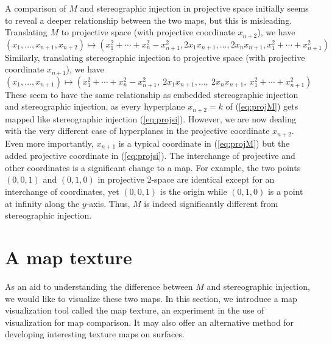 A comparison of $M$ and stereographic injection in projective space initially 
seems to reveal a deeper relationship between the two maps,
but this is misleading.
Translating $M$ to projective space (with projective coordinate $x_{n+2}$), 
we have
\begin{equation}
\label{eq:projM}
(x_1,\ldots,x_{n+1},x_{n+2}) \mapsto 
	(x_1^2 + \cdots + x_{n}^2 - x_{n+1}^2,
	 2x_1x_{n+1}, \ldots, 2x_nx_{n+1}, x_1^2 + \cdots + x_{n+1}^2)
\end{equation}
Similarly, translating stereographic injection to projective space 
(with projective coordinate $x_{n+1}$), we have
\begin{equation}
\label{eq:projsi}
	(x_1,\ldots,x_{n+1}) \mapsto
	(x_1^2 + \cdots + x_n^2 - x_{n+1}^2,\ 2x_{1}x_{n+1}, \ldots,\ 2x_{n}x_{n+1},\ 
	x_1^2 + \cdots + x_{n+1}^2)
\end{equation}
These seem to have the same relationship as embedded stereographic
injection and stereographic injection,
as every hyperplane $x_{n+2}=k$ of (\ref{eq:projM}) gets mapped 
like stereographic injection (\ref{eq:projsi}).
However, we are now dealing with the very different case of 
hyperplanes in the projective coordinate $x_{n+2}$.
Even more importantly, $x_{n+1}$ is a typical %
coordinate in (\ref{eq:projM}) but the added projective coordinate in (\ref{eq:projsi}).
The interchange of projective and other coordinates is a significant
change to a map. %
For example, the two points $(0,0,1)$ and $(0,1,0)$ in projective 2-space
are identical except for an interchange of coordinates,
yet $(0,0,1)$ is the origin while $(0,1,0)$ is a point at infinity
along the $y$-axis.
Thus, $M$ is indeed significantly different from stereographic injection.

\section{A map texture}
\label{sec:maptexture}

As an aid to understanding the difference between $M$ and stereographic 
injection, we would like to visualize these two maps.
In this section, we introduce a map visualization tool called the map texture,
an experiment in the use of visualization for map comparison.
It may also offer an alternative method for developing interesting texture
maps on surfaces.

